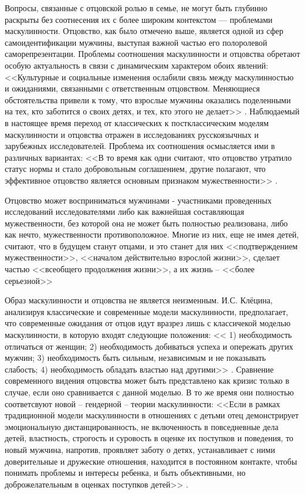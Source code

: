 \documentclass{../../common/thesisbyxetex}
\begin{document}
Вопросы, связанные с отцовской ролью в семье, не могут быть глубинно раскрыты без
соотнесения их с более широким контекстом --- проблемами маскулинности. Отцовство, как было
отмечено выше, является одной из сфер самоидентификации мужчины, выступая
важной частью его полоролевой саморепрезентации. Проблемы соотношения маскулинности и отцовства
обретают особую актуальность в связи с динамическим характером обоих явлений: <<Культурные и
социальные изменения ослабили связь между маскулинностью и ожиданиями, связанными с ответственным
отцовством. Меняющиеся обстоятельства привели к тому, что взрослые мужчины оказались поделенными
на тех, кто заботится о своих детях, и тех, кто этого не делает>> \cite[132]{f21}. Наблюдаемый в
настоящее время переход от классических к постклассическим моделям маскулинности и отцовства
отражен в исследованиях русскоязычных и зарубежных исследователей. Проблема их соотношения
осмысляется ими в различных вариантах: <<В то время как одни считают, что отцовство утратило
статус нормы и стало добровольным соглашением, другие полагают, что эффективное отцовство является
основным признаком мужественности>> \cite[132]{f21}.

Отцовство может восприниматься мужчинами - участниками проведенных
исследований исследователями либо как важнейшая составляющая
мужественности, без которой она не может быть полностью реализована, либо как нечто, мужественности
противоположное. Многие из них, еще не имея детей, считают, что в будущем станут отцами, и это
станет для них <<подтверждением мужественности>>, <<началом действительно взрослой жизни>>, сделает
частью <<всеобщего продолжения жизни>>, а их жизнь -- <<более серьезной>> \cite[367]{tri}

Образ маскулинности и отцовства не является неизменным. И.С. Клёцина, анализируя
классические и современные модели маскулинности, предполагает, что современные ожидания от отцов
идут вразрез лишь с классичекой моделью маскулинности, в которую входят следующие положения:
<< 1) необходимость отличаться от женщин; 2)
необходимость добиваться успеха и опережать других мужчин; 3) необходимость быть сильным,
независимым и не показывать слабость; 4) необходимость обладать властью над другими>> \cite{clec}.
Сравнение современного видения отцовства может быть представлено как кризис только в случае, если
оно сравнивается с данной моделью.
В то же время они полностью соответсвуют новой -- гендерной -- теории маскулинности: <<Если в рамках
традиционной модели маскулинности в отношениях с детьми отец демонстрирует эмоциональную
дистанцированность, не включенность в повседневные дела детей, властность, строгость и суровость в
оценке их поступков и поведения, то новый мужчина, напротив, проявляет заботу о детях, устанавливает
с ними доверительные и дружеские отношения, находится в постоянном контакте, чтобы понимать проблемы
и интересы ребенка, и быть объективными, но доброжелательным в оценках поступков детей>>
\cite{clec}.
\end{document}
